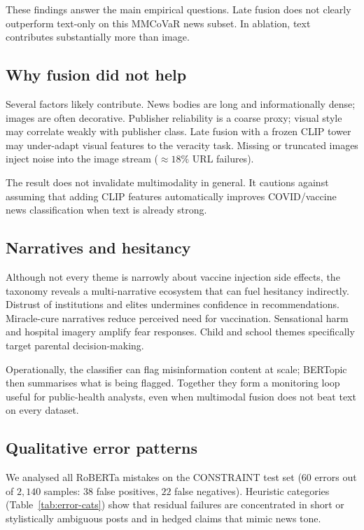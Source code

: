 \documentclass[12pt, a4paper]{report}
\begin{document}
These findings answer the main empirical questions.
Late fusion does not clearly outperform text-only on this MMCoVaR news subset.
In ablation, text contributes substantially more than image.

\subsection{Why fusion did not help}

Several factors likely contribute.
News bodies are long and informationally dense; images are often decorative.
Publisher reliability is a coarse proxy; visual style may correlate weakly with publisher class.
Late fusion with a frozen CLIP tower may under-adapt visual features to the veracity task.
Missing or truncated images inject noise into the image stream ($\approx 18\%$ URL failures).

The result does not invalidate multimodality in general.
It cautions against assuming that adding CLIP features automatically improves COVID/vaccine news classification when text is already strong.

\subsection{Narratives and hesitancy}

Although not every theme is narrowly about vaccine injection side effects, the taxonomy reveals a multi-narrative ecosystem that can fuel hesitancy indirectly.
Distrust of institutions and elites undermines confidence in recommendations.
Miracle-cure narratives reduce perceived need for vaccination.
Sensational harm and hospital imagery amplify fear responses.
Child and school themes specifically target parental decision-making.

Operationally, the classifier can flag misinformation content at scale; BERTopic then summarises what is being flagged.
Together they form a monitoring loop useful for public-health analysts, even when multimodal fusion does not beat text on every dataset.

\subsection{Qualitative error patterns}

We analysed all RoBERTa mistakes on the CONSTRAINT test set ($60$ errors out of $2{,}140$ samples: $38$ false positives, $22$ false negatives).
Heuristic categories (Table~\ref{tab:error-cats}) show that residual failures are concentrated in short or stylistically ambiguous posts and in hedged claims that mimic news tone.
\end{document}
